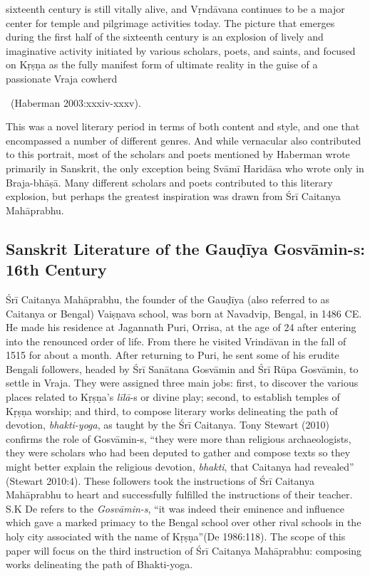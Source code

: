\begin{myquote}
sixteenth century is still vitally alive, and Vṛndāvana continues to be a major center for temple and pilgrimage activities today. The picture that emerges during the first half of the sixteenth century is an explosion of lively and imaginative activity initiated by various scholars, poets, and saints, and focused on Kṛṣṇa as the fully manifest form of ultimate reality in the guise of a passionate Vraja cowherd 

~\hfill(Haberman 2003:xxxiv-xxxv). 
\end{myquote}

This was a novel literary period in terms of both content and style, and one that encompassed a number of different genres. And while vernacular also contributed to this portrait, most of the scholars and poets mentioned by Haberman wrote primarily in Sanskrit, the only exception being Svāmī Haridāsa who wrote only in Braja-bhāṣā. Many different scholars and poets contributed to this literary explosion, but perhaps the greatest inspiration was drawn from Śrī Caitanya Mahāprabhu. 

\subsection*{Sanskrit Literature of the Gauḍīya Gosvāmin-s: 16th Century}

Śrī Caitanya Mahāprabhu, the founder of the Gauḍīya (also referred to as Caitanya or Bengal) Vaiṣṇava school, was born at Navadvip, Bengal, in 1486 CE. He made his residence at Jagannath Puri, Orrisa, at the age of 24 after entering into the renounced order of life. From there he visited Vrindāvan in the fall of 1515 for about a month. After returning to Puri, he sent some of his erudite Bengali followers, headed by Śrī Sanātana Gosvāmin and Śrī Rūpa Gosvāmin, to settle in Vraja. They were assigned three main jobs: first, to discover the various places related to Kṛṣṇa’s {\sl līlā}-s or divine play; second, to establish temples of Kṛṣṇa worship; and third, to compose literary works delineating the path of devotion, {\sl bhakti-yoga}, as taught by the Śrī Caitanya. Tony Stewart (2010) confirms the role of Gosvāmin-s, “they were more than religious archaeologists, they were scholars who had been deputed to gather and compose texts so they might better explain the religious devotion, {\sl bhakti}, that Caitanya had revealed” (Stewart 2010:4). These followers took the instructions of Śrī Caitanya Mahāprabhu to heart and successfully fulfilled the instructions of their teacher. S.K De refers to the {\sl Gosvāmin-s}, “it was indeed their eminence and influence which gave a marked primacy to the Bengal school over other rival schools in the holy city associated with the name of Kṛṣṇa”(De 1986:118). The scope of this paper will focus on the third instruction of Śrī Caitanya Mahāprabhu: composing works delineating the path of Bhakti-yoga. 

